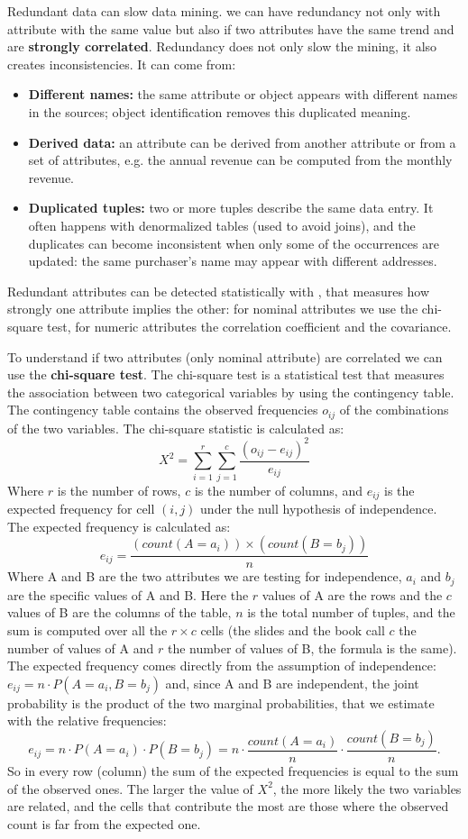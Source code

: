 Redundant data can slow data mining. we can have redundancy not only with attribute with the same value but also if two attributes have the same trend and are \textbf{strongly correlated}.
Redundancy does not only slow the mining, it also creates inconsistencies. It can come from:
\begin{itemize}
    \item \textbf{Different names:} the same attribute or object appears with different names in the sources; object identification removes this duplicated meaning.
    \item \textbf{Derived data:} an attribute can be derived from another attribute or from a set of attributes, e.g. the annual revenue can be computed from the monthly revenue.
    \item \textbf{Duplicated tuples:} two or more tuples describe the same data entry. It often happens with denormalized tables (used to avoid joins), and the duplicates can become inconsistent when only some of the occurrences are updated: the same purchaser's name may appear with different addresses.
\end{itemize}
Redundant attributes can be detected statistically with , that measures how strongly one attribute implies the other: for nominal attributes we use the chi-square test, for numeric attributes the correlation coefficient and the covariance.

To understand if two attributes (only nominal attribute) are correlated we can use the \textbf{chi-square test}. 
The chi-square test is a statistical test that measures the association between two categorical variables by using the contingency table. The contingency table
contains the observed frequencies $o_{ij}$ of the combinations of the two variables. The chi-square statistic is calculated as:
\[ X^2 = \sum_{i=1}^{r} \sum_{j=1}^{c} \frac{(o_{ij} - e_{ij})^2}{e_{ij}} \]
Where $r$ is the number of rows, $c$ is the number of columns, and $e_{ij}$ is the expected frequency for cell $(i,j)$ under the null hypothesis of independence. The expected frequency is calculated as:
\[ e_{ij} = \frac{(count(A=a_i)) \times (count(B=b_j))}{n} \]
Where A and B are the two attributes we are testing for independence, $a_i$ and $b_j$ are the specific values of A and B.
Here the $r$ values of A are the rows and the $c$ values of B are the columns of the table, $n$ is the total number of tuples, and the sum is computed over all the $r \times c$ cells (the slides and the book call $c$ the number of values of A and $r$ the number of values of B, the formula is the same).
The expected frequency comes directly from the assumption of independence: $e_{ij}=n\cdot P(A=a_i,B=b_j)$ and, since A and B are independent, the joint probability is the product of the two marginal probabilities, that we estimate with the relative frequencies:
\[
    e_{ij}=n\cdot P(A=a_i)\cdot P(B=b_j)=n\cdot\frac{count(A=a_i)}{n}\cdot\frac{count(B=b_j)}{n}.
\]
So in every row (column) the sum of the expected frequencies is equal to the sum of the observed ones. The larger the value of $X^2$, the more likely the two variables are related, and the cells that contribute the most are those where the observed count is far from the expected one.
\\

